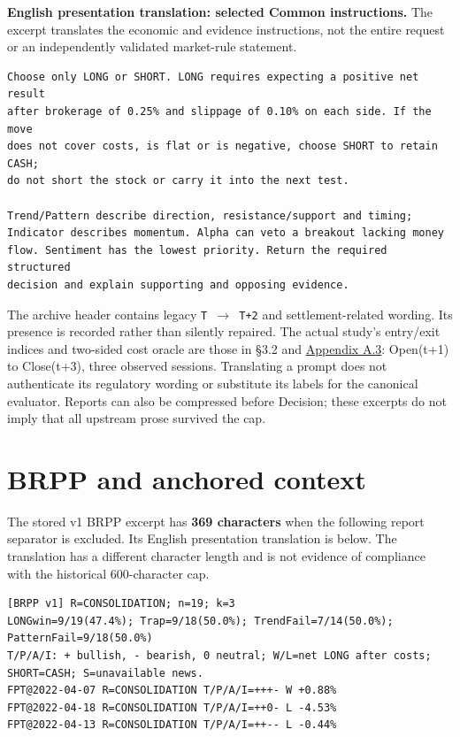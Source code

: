 \textbf{English presentation translation: selected Common instructions.} The
excerpt translates the economic and evidence instructions, not the entire
request or an independently validated market-rule statement.

\begin{Verbatim}[fontsize=\small,breaklines=true,breakanywhere=true]
Choose only LONG or SHORT. LONG requires expecting a positive net result
after brokerage of 0.25% and slippage of 0.10% on each side. If the move
does not cover costs, is flat or is negative, choose SHORT to retain CASH;
do not short the stock or carry it into the next test.

Trend/Pattern describe direction, resistance/support and timing;
Indicator describes momentum. Alpha can veto a breakout lacking money
flow. Sentiment has the lowest priority. Return the required structured
decision and explain supporting and opposing evidence.
\end{Verbatim}

The archive header contains legacy \texttt{T \ensuremath{\rightarrow} T+2} and settlement-related
wording. Its presence is recorded rather than silently repaired. The
actual study's entry/exit indices and two-sided cost oracle are those in
§3.2 and \hyperref[s:1b09358c673b31ee]{Appendix A.3}:
Open(t+1) to Close(t+3), three observed sessions. Translating a prompt does
not authenticate its regulatory wording or substitute its labels for the
canonical evaluator. Reports can also be compressed before Decision;
these excerpts do not imply that all upstream prose survived the cap.

\section{BRPP and anchored context}\label{s:c691c65627262de3}

The stored v1 BRPP excerpt has \textbf{369 characters} when
the following report separator is excluded. Its English presentation
translation is below. The translation has a different character length
and is not evidence of compliance with the historical 600-character cap.

\begin{Verbatim}[fontsize=\small,breaklines=true,breakanywhere=true]
[BRPP v1] R=CONSOLIDATION; n=19; k=3
LONGwin=9/19(47.4%); Trap=9/18(50.0%); TrendFail=7/14(50.0%); PatternFail=9/18(50.0%)
T/P/A/I: + bullish, - bearish, 0 neutral; W/L=net LONG after costs;
SHORT=CASH; S=unavailable news.
FPT@2022-04-07 R=CONSOLIDATION T/P/A/I=+++- W +0.88%
FPT@2022-04-18 R=CONSOLIDATION T/P/A/I=++0- L -4.53%
FPT@2022-04-13 R=CONSOLIDATION T/P/A/I=++-- L -0.44%
\end{Verbatim}

